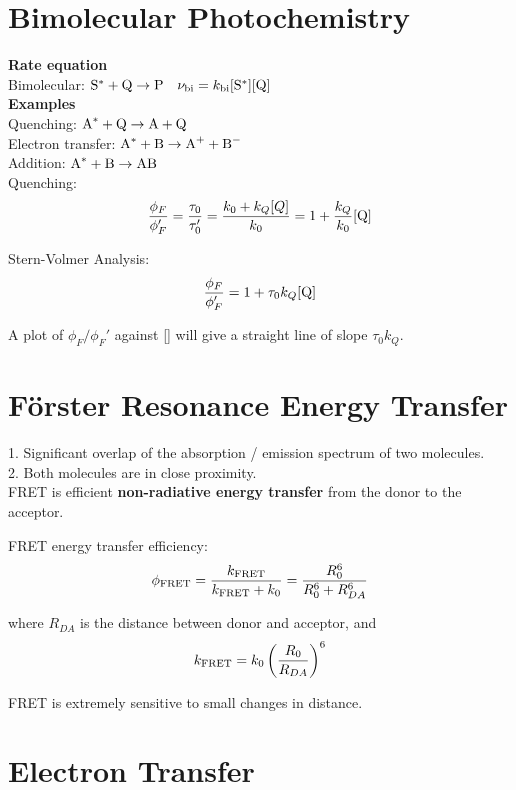 \section{Bimolecular Photochemistry}
\textbf{Rate equation} \\
Bimolecular: $\ce{S}^{*} + \ce{Q} \rightarrow \ce{P} \quad \nu_{\mathrm{bi}} = k_{\mathrm{bi}} [\ce{S}^{*}][\ce{Q}]$\\

\textbf{Examples} \\
Quenching: $\ce{A^*} + \ce{Q} \rightarrow \ce{A} + \ce{Q}$ \\
Electron transfer: $\ce{A^*} + \ce{B} \rightarrow \ce{A+} + \ce{B-}$ \\
Addition: $\ce{A^*} + \ce{B} \rightarrow \ce{AB}$ \\

Quenching:
\begin{equation*}
  \frac{\phi_{F}}{\phi_{F}'} = \frac{\tau_0}{\tau_0'} = \frac{k_0 + k_Q[Q]}{k_0} = 1 + \frac{k_Q}{k_0}[\ce{Q}]
\end{equation*}

Stern-Volmer Analysis:
$$\frac{\phi_F}{\phi_F'} = 1 + \tau_0 k_Q[\ce{Q}]$$

A plot of $\phi_F/\phi_F'$ against [] will give a straight line of slope $\tau_0 k_Q$.
\section{Förster Resonance Energy Transfer}
1. Significant overlap of the absorption / emission spectrum of two molecules. \\
2. Both molecules are in close proximity. \\
FRET is efficient \textbf{non-radiative energy transfer} from the donor to the acceptor.
\vspace{\baselineskip}

FRET energy transfer efficiency:
$$\phi_{\ce{FRET}} = \frac{k_{\ce{FRET}}}{k_{\ce{FRET}}+k_0} = \frac{R_0^6}{R_0^6+R_{DA}^6}$$

where $R_{DA}$ is the distance between donor and acceptor, and 
$$k_{\ce{FRET}} = k_0 \left( \frac{R_0}{R_{DA}} \right)^6$$

FRET is extremely sensitive to small changes in distance.

\section{Electron Transfer}
